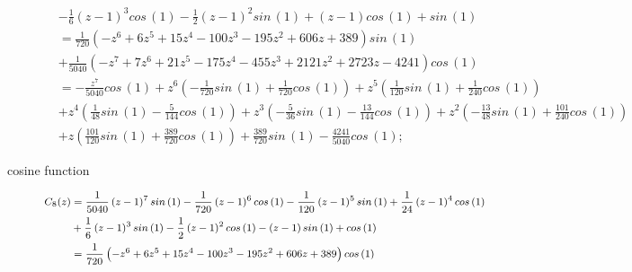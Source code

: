 \begin{description}
\begin{displaymath}
\begin{split}
                             &- \frac{1}{6} \left(z - 1\right)^{3} cos\,{\left (1 \right )} - \frac{1}{2} \left(z - 1\right)^{2} sin\,{\left (1 \right )} + \left(z - 1\right) cos\,{\left (1 \right )} + sin\,{\left (1 \right )}\\
                             &= \frac{1}{720} \left(- z^{6} + 6 z^{5} + 15 z^{4} - 100 z^{3} - 195 z^{2} + 606 z + 389\right) sin\,{\left (1 \right )} \\
                             &+ \frac{1}{5040} \left(- z^{7} + 7 z^{6} + 21 z^{5} - 175 z^{4} - 455 z^{3} + 2121 z^{2} + 2723 z - 4241\right) cos\,{\left (1 \right )} \\
                             &= - \frac{z^{7}}{5040} cos\,{\left (1 \right )} + z^{6} \left(- \frac{1}{720} sin\,{\left (1 \right )} + \frac{1}{720} cos\,{\left (1 \right )}\right) + z^{5} \left(\frac{1}{120} sin\,{\left (1 \right )} + \frac{1}{240} cos\,{\left (1 \right )}\right) \\
                             &+ z^{4} \left(\frac{1}{48} sin\,{\left (1 \right )} - \frac{5}{144} cos\,{\left (1 \right )}\right) + z^{3} \left(- \frac{5}{36} sin\,{\left (1 \right )} - \frac{13}{144} cos\,{\left (1 \right )}\right) + z^{2} \left(- \frac{13}{48} sin\,{\left (1 \right )} + \frac{101}{240} cos\,{\left (1 \right )}\right) \\
                             &+ z \left(\frac{101}{120} sin\,{\left (1 \right )} + \frac{389}{720} cos\,{\left (1 \right )}\right) + \frac{389}{720} sin\,{\left (1 \right )} - \frac{4241}{5040} cos\,{\left (1 \right )};
    \end{split}
\end{displaymath}
\item[cosine function]
\begin{displaymath}
    \footnotesize
    \begin{split}
        C_{8}{\left (z \right )} &= \frac{1}{5040} \left(z - 1\right)^{7} sin\,{\left (1 \right )} - \frac{1}{720} \left(z - 1\right)^{6} cos\,{\left (1 \right )} - \frac{1}{120} \left(z - 1\right)^{5} sin\,{\left (1 \right )} + \frac{1}{24} \left(z - 1\right)^{4} cos\,{\left (1 \right )} \\ &+ \frac{1}{6} \left(z - 1\right)^{3} sin\,{\left (1 \right )} - \frac{1}{2} \left(z - 1\right)^{2} cos\,{\left (1 \right )} - \left(z - 1\right) sin\,{\left (1 \right )} + cos\,{\left (1 \right )} \\
                             &= \frac{1}{720} \left(- z^{6} + 6 z^{5} + 15 z^{4} - 100 z^{3} - 195 z^{2} + 606 z + 389\right) cos\,{\left (1 \right )} \\

\end{split}
\end{displaymath}
\end{description}
